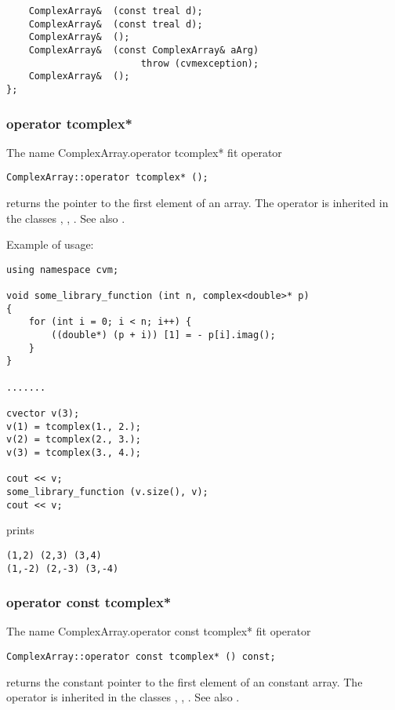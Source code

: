 \verb"    ComplexArray& "\verb" (const treal d);"\\
\verb"    ComplexArray& "\verb" (const treal d);"\\
\verb"    ComplexArray& "\verb" ();"\\
\verb"    ComplexArray& "\verb" (const ComplexArray& aArg)"\\
\verb"                        throw (cvmexception);"\\
\verb"    ComplexArray& "\verb" ();"\\
\verb"};"
\newpage




\subsubsection{operator tcomplex*}
The%
\pdfdest name {ComplexArray.operator tcomplex*} fit{ }
operator
\begin{verbatim}
ComplexArray::operator tcomplex* ();
\end{verbatim}
returns the pointer to the first element of an array.
The operator is inherited in the classes
,
,
.
See also .

Example of usage:
\begin{verbatim}
using namespace cvm;

void some_library_function (int n, complex<double>* p)
{
    for (int i = 0; i < n; i++) {
        ((double*) (p + i)) [1] = - p[i].imag();
    }
}

.......

cvector v(3);
v(1) = tcomplex(1., 2.);
v(2) = tcomplex(2., 3.);
v(3) = tcomplex(3., 4.);

cout << v;
some_library_function (v.size(), v);
cout << v;
\end{verbatim}
prints
\begin{verbatim}
(1,2) (2,3) (3,4)
(1,-2) (2,-3) (3,-4)
\end{verbatim}
\newpage




\subsubsection{operator const tcomplex*}
The%
\pdfdest name {ComplexArray.operator const tcomplex*} fit{ }
operator
\begin{verbatim}
ComplexArray::operator const tcomplex* () const;
\end{verbatim}
returns the constant pointer to the first
element of an constant array.
The operator is inherited in the classes
,
,
.
See also .

